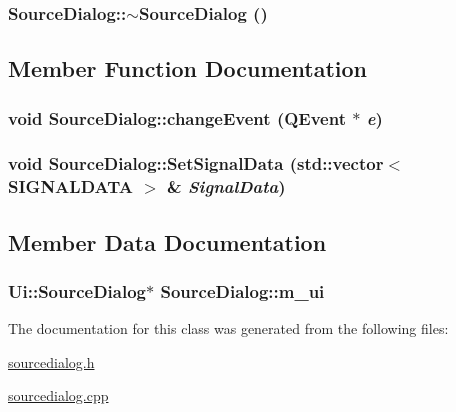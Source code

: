 \hypertarget{class_source_dialog_f2d3c9ead8959ec6c3f73284db63b400}{
\subsubsection[{$\sim$SourceDialog}]{\setlength{\rightskip}{0pt plus 5cm}SourceDialog::$\sim$SourceDialog ()}}
\label{class_source_dialog_f2d3c9ead8959ec6c3f73284db63b400}




\subsection{Member Function Documentation}
\hypertarget{class_source_dialog_90ae03b903842b3d703872b351e871bc}{
\subsubsection[{changeEvent}]{\setlength{\rightskip}{0pt plus 5cm}void SourceDialog::changeEvent (QEvent $\ast$ {\em e})}}
\label{class_source_dialog_90ae03b903842b3d703872b351e871bc}


\hypertarget{class_source_dialog_323288d35c5ae02a9b4ac6450d2eb3de}{
\subsubsection[{SetSignalData}]{\setlength{\rightskip}{0pt plus 5cm}void SourceDialog::SetSignalData (std::vector$<$ {\bf SIGNALDATA} $>$ \& {\em SignalData})}}
\label{class_source_dialog_323288d35c5ae02a9b4ac6450d2eb3de}




\subsection{Member Data Documentation}
\hypertarget{class_source_dialog_c831372ff1959faa98c6336e2384974f}{
\subsubsection[{m\_\-ui}]{\setlength{\rightskip}{0pt plus 5cm}Ui::SourceDialog$\ast$ {\bf SourceDialog::m\_\-ui}}}
\label{class_source_dialog_c831372ff1959faa98c6336e2384974f}




The documentation for this class was generated from the following files:\begin{CompactItemize}
\item 
\hyperlink{sourcedialog_8h}{sourcedialog.h}\item 
\hyperlink{sourcedialog_8cpp}{sourcedialog.cpp}\end{CompactItemize}
